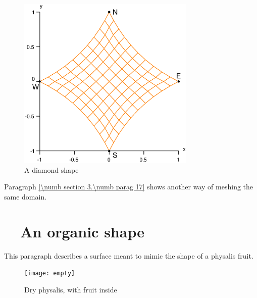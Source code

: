 \begin{figure} \centering
  \includegraphics[width=85mm]{diamond}
  \caption{A diamond shape}
  \label{\numb section 2.\numb fig 9}
\end{figure}

Paragraph \ref{\numb section 3.\numb parag 17} shows another way of meshing the same domain.


\section{~~An organic shape}\label{\numb section 2.\numb parag 10}

This paragraph describes a surface meant to mimic the shape of a physalis fruit.

\begin{figure}[h!]\centering
  \texttt{[image: empty]}
  \caption{Dry physalis, with fruit inside}\label{\numb section 2.\numb fig 10}
\end{figure}

